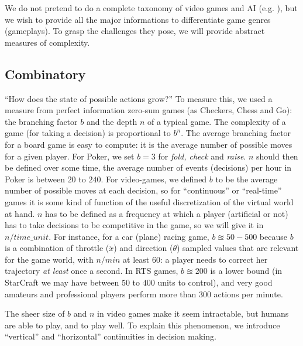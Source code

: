 We do not pretend to do a complete taxonomy of video games and AI (e.g. \citep{gunn}), but we wish to provide all the major informations to differentiate game genres (gameplays). To grasp the challenges they pose, we will provide abstract measures of complexity.

\subsection{Combinatory}
``How does the state of possible actions grow?'' To measure this, we used a measure from perfect information zero-sum games (as Checkers, Chess and Go): the branching factor $b$ and the depth $n$ of a typical game. The complexity of a game (for taking a decision) is proportional to $b^n$. The average branching factor for a board game is easy to compute: it is the average number of possible moves for a given player. For Poker, we set $b=3$ for \textit{fold, check} and \textit{raise}. $n$ should then be defined over some time, the average number of events (decisions) per hour in Poker is between $20$ to $240$. For video-games, we defined $b$ to be the average number of possible moves at each decision, so for ``continuous'' or ``real-time'' games it is some kind of function of the useful discretization of the virtual world at hand. $n$ has to be defined as a frequency at which a player (artificial or not) has to take decisions to be competitive in the game, so we will give it in $n/time\_unit$. For instance, for a car (plane) racing game, $b \approxeq 50-500$ because $b$ is a combination of throttle ($\ddot{x}$) and direction ($\theta$) sampled values that are relevant for the game world, with $n/min$ at least $60$: a player needs to correct her trajectory \textit{at least} once a second. In RTS games, $b \approxeq 200$ is a lower bound (in StarCraft we may have between $50$ to $400$ units to control), and very good amateurs and professional players perform more than $300$ actions per minute.

The sheer size of $b$ and $n$ in video games make it seem intractable, but humans are able to play, and to play well. To explain this phenomenon, we introduce ``vertical'' and ``horizontal'' continuities in decision making.

